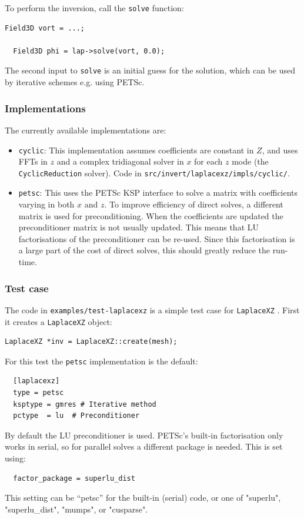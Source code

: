 \documentclass[12pt]{article}
\begin{document}
To perform the inversion, call the
%
\lstinline!solve!
%
 function:
%
\begin{lstlisting}[numbers=none]
  Field3D vort = ...;

  Field3D phi = lap->solve(vort, 0.0);
\end{lstlisting}
%
The second input to
%
\lstinline!solve!
%
 is an initial guess for the solution, which can be used by iterative schemes
 e.g. using PETSc.


\subsubsection{Implementations}
%
The currently available implementations are:
%
\begin{itemize}
\item \texttt{cyclic}: This implementation assumes coefficients are constant in
    $Z$, and uses FFTs in $z$ and a complex tridiagonal solver in $x$ for each
    $z$ mode (the \texttt{CyclicReduction} solver). Code in
    \texttt{src/invert/laplacexz/impls/cyclic/}.
\item \texttt{petsc}: This uses the PETSc KSP interface to solve a matrix with coefficients varying in both $x$
  and $z$. To improve efficiency of direct solves, a different matrix is used
  for preconditioning. When the coefficients are updated the preconditioner
  matrix is not usually updated. This means that LU factorisations of the
  preconditioner can be re-used. Since this factorisation is a large part of
  the cost of direct solves, this should greatly reduce the run-time.
\end{itemize}
%


\subsubsection{Test case}
%
The code in \texttt{examples/test-laplacexz} is a simple test case for
%
\lstinline!LaplaceXZ!
%
.  First it creates a
%
\lstinline!LaplaceXZ!
%
 object:
%
\begin{lstlisting}[numbers=none]
  LaplaceXZ *inv = LaplaceXZ::create(mesh);
\end{lstlisting}
%
For this test the \texttt{petsc} implementation is the default:
%
\begin{verbatim}
  [laplacexz]
  type = petsc
  ksptype = gmres # Iterative method
  pctype  = lu  # Preconditioner
\end{verbatim}
%
By default the LU preconditioner is used. PETSc's built-in factorisation only
works in serial, so for parallel solves a different package is needed. This is
set using:
%
\begin{verbatim}
  factor_package = superlu_dist
\end{verbatim}
%
This setting can be ``petsc'' for the built-in (serial) code, or one of
"superlu", "superlu\_dist", "mumps", or "cusparse".
\end{document}
